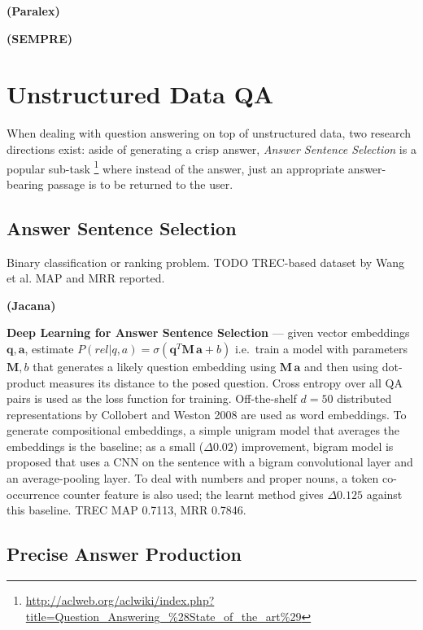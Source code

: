 \textbf{(Paralex)} \cite{Fader2013Paraphrase}

\textbf{(SEMPRE)} \cite{SPBerant2014Paraphrase}

\section{Unstructured Data QA}

When dealing with question answering on top of unstructured data,
two research directions exist: aside of generating a crisp answer,
\textit{Answer Sentence Selection} is a popular sub-task%
\footnote{\url{http://aclweb.org/aclwiki/index.php?title=Question_Answering_\%28State_of_the_art\%29}}
where instead of the answer, just an appropriate answer-bearing passage
is to be returned to the user.

\subsection{Answer Sentence Selection}

Binary classification or ranking problem.
TODO TREC-based dataset by Wang et al.
MAP and MRR reported.

\textbf{(Jacana)} \cite{TreeEdit2013Yao}

\textbf{Deep Learning for Answer Sentence Selection} \cite{Yu2014Deep}
	--- given vector embeddings $\mathbf{q}, \mathbf{a}$, estimate
	$P(rel|q,a) = \sigma(\mathbf{q}^T \mathbf{M}\, \mathbf{a} + b)$
	i.e.\ train a model with parameters $\mathbf{M}, b$ that
	generates a likely question embedding using $\mathbf{M}\, \mathbf{a}$
	and then using dot-product measures its distance to the posed question.
	Cross entropy over all QA pairs is used as the loss function for training.
	Off-the-shelf $d=50$ distributed representations by Collobert and Weston 2008
	are used as word embeddings.
	To generate compositional embeddings,
	a simple unigram model that averages the embeddings is the baseline;
	as a small ($\Delta 0.02$) improvement, bigram model is proposed that uses a CNN
	on the sentence with a bigram convolutional layer and an average-pooling layer.
	To deal with numbers and proper nouns, a token co-occurrence counter
	feature is also used; the learnt method gives $\Delta 0.125$ against this baseline.
	TREC MAP 0.7113, MRR 0.7846.

\subsection{Precise Answer Production}

